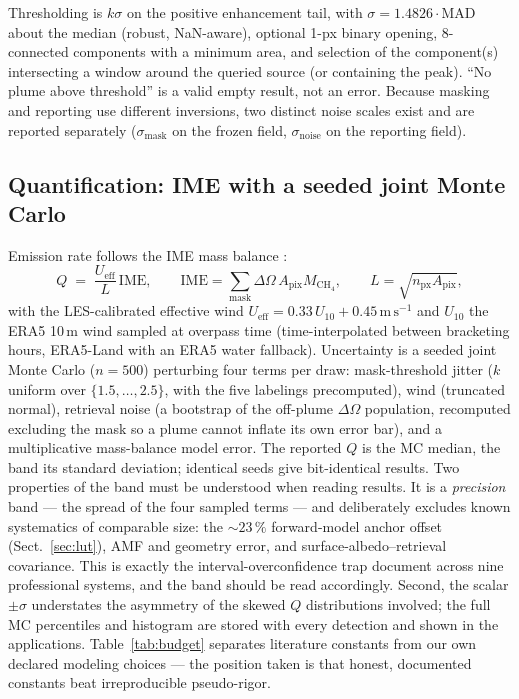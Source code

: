 \documentclass[11pt]{article}
\newcommand{\dOm}{\Delta\Omega}
\begin{document}
Thresholding is $k\sigma$ on the positive enhancement tail, with $\sigma =
1.4826 \cdot \mathrm{MAD}$ about the median (robust, NaN-aware), optional
1-px binary opening, 8-connected components with a minimum area, and
selection of the component(s) intersecting a window around the queried
source (or containing the peak). ``No plume above threshold'' is a valid
empty result, not an error. Because masking and reporting use different
inversions, two distinct noise scales exist and are reported separately
($\sigma_{\mathrm{mask}}$ on the frozen field, $\sigma_{\mathrm{noise}}$
on the reporting field).

\subsection{Quantification: IME with a seeded joint Monte Carlo}\label{sec:ime}

Emission rate follows the IME mass balance
\citep{varon2018,varon2021}:
\begin{equation}
  Q \;=\; \frac{U_{\mathrm{eff}}}{L}\,\mathrm{IME},
  \qquad
  \mathrm{IME} = \sum_{\mathrm{mask}} \dOm \, A_{\mathrm{pix}}
  M_{\mathrm{CH_4}},
  \qquad
  L = \sqrt{n_{\mathrm{px}} A_{\mathrm{pix}}},
\end{equation}
with the LES-calibrated effective wind $U_{\mathrm{eff}} = 0.33\,U_{10} +
0.45\,\mathrm{m\,s^{-1}}$ and $U_{10}$ the ERA5 10\,m wind sampled at
overpass time (time-interpolated between bracketing hours, ERA5-Land with
an ERA5 water fallback). Uncertainty is a seeded joint Monte Carlo
($n{=}500$) perturbing four terms per draw: mask-threshold jitter ($k$
uniform over $\{1.5, \dots, 2.5\}$, with the five labelings precomputed),
wind (truncated normal), retrieval noise (a bootstrap of the off-plume
$\dOm$ population, recomputed excluding the mask so a plume cannot inflate
its own error bar), and a multiplicative mass-balance model error. The
reported $Q$ is the MC median, the band its standard deviation; identical
seeds give bit-identical results. Two properties of the band must be
understood when reading results. It is a \emph{precision} band --- the
spread of the four sampled terms --- and deliberately excludes known
systematics of comparable size: the ${\sim}23\,\%$ forward-model anchor
offset (Sect.~\ref{sec:lut}), AMF and geometry error, and
surface-albedo--retrieval covariance. This is exactly the
interval-overconfidence trap \citet{sherwin2024} document across nine
professional systems, and the band should be read accordingly. Second,
the scalar $\pm\sigma$ understates the asymmetry of the skewed $Q$
distributions involved; the full MC percentiles and histogram are stored
with every detection and shown in the applications.
Table~\ref{tab:budget} separates
literature constants from our own declared modeling choices --- the
position taken is that honest, documented constants beat irreproducible
pseudo-rigor.
\end{document}
